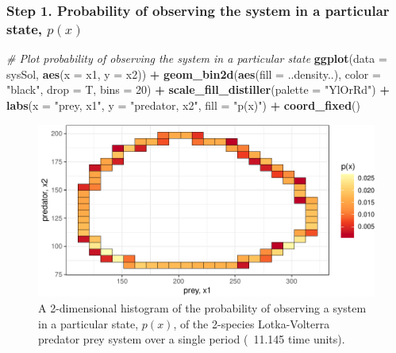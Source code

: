 \documentclass[12pt,twoside,openany]{reedthesis}
\newenvironment{Shaded}{\begin{snugshade}}{\end{snugshade}}
\newcommand{\KeywordTok}[1]{\textcolor[rgb]{0.13,0.29,0.53}{\textbf{#1}}}
\newcommand{\DataTypeTok}[1]{\textcolor[rgb]{0.13,0.29,0.53}{#1}}
\newcommand{\DecValTok}[1]{\textcolor[rgb]{0.00,0.00,0.81}{#1}}
\newcommand{\StringTok}[1]{\textcolor[rgb]{0.31,0.60,0.02}{#1}}
\newcommand{\CommentTok}[1]{\textcolor[rgb]{0.56,0.35,0.01}{\textit{#1}}}
\newcommand{\OperatorTok}[1]{\textcolor[rgb]{0.81,0.36,0.00}{\textbf{#1}}}
\newcommand{\NormalTok}[1]{#1}
\begin{document}
\subsubsection{\texorpdfstring{\textbf{Step 1. Probability of observing
the system in a particular state,
\(p(x)\)}}{Step 1. Probability of observing the system in a particular state, p(x)}}\label{step-1.-probability-of-observing-the-system-in-a-particular-state-px}
\begin{Shaded}
\begin{Highlighting}[]
\CommentTok{# Plot probability of observing the system in a particular state}
\KeywordTok{ggplot}\NormalTok{(}\DataTypeTok{data =}\NormalTok{ sysSol, }\KeywordTok{aes}\NormalTok{(}\DataTypeTok{x =}\NormalTok{ x1, }\DataTypeTok{y =}\NormalTok{ x2)) }\OperatorTok{+}
\StringTok{  }\KeywordTok{geom_bin2d}\NormalTok{(}\KeywordTok{aes}\NormalTok{(}\DataTypeTok{fill =}\NormalTok{ ..density..), }\DataTypeTok{color =} \StringTok{"black"}\NormalTok{, }\DataTypeTok{drop =}\NormalTok{ T, }\DataTypeTok{bins =} \DecValTok{20}\NormalTok{) }\OperatorTok{+}
\StringTok{  }\KeywordTok{scale_fill_distiller}\NormalTok{(}\DataTypeTok{palette =} \StringTok{"YlOrRd"}\NormalTok{) }\OperatorTok{+}
\StringTok{  }\KeywordTok{labs}\NormalTok{(}\DataTypeTok{x =} \StringTok{"prey, x1"}\NormalTok{, }\DataTypeTok{y =} \StringTok{"predator, x2"}\NormalTok{, }\DataTypeTok{fill =} \StringTok{"p(x)"}\NormalTok{) }\OperatorTok{+}
\StringTok{  }\KeywordTok{coord_fixed}\NormalTok{()}
\end{Highlighting}
\end{Shaded}
\begin{figure}
\includegraphics[width=0.85\linewidth]{_myDissertation_files/figure-latex/2D-hist-1} \caption{A 2-dimensional histogram of the probability of observing a system in a particular state, $p(x)$, of the 2-species Lotka-Volterra predator prey system over a single period (~11.145 time units).}\label{fig:2D-hist}
\end{figure}
\end{document}
